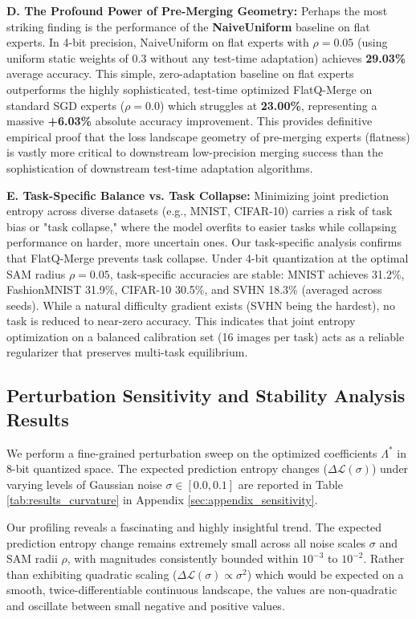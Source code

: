 \textbf{D. The Profound Power of Pre-Merging Geometry:}
Perhaps the most striking finding is the performance of the \textbf{NaiveUniform} baseline on flat experts. In 4-bit precision, NaiveUniform on flat experts with $\rho=0.05$ (using uniform static weights of 0.3 without any test-time adaptation) achieves \textbf{29.03\%} average accuracy. This simple, zero-adaptation baseline on flat experts outperforms the highly sophisticated, test-time optimized FlatQ-Merge on standard SGD experts ($\rho=0.0$) which struggles at \textbf{23.00\%}, representing a massive \textbf{+6.03\%} absolute accuracy improvement. This provides definitive empirical proof that the loss landscape geometry of pre-merging experts (flatness) is vastly more critical to downstream low-precision merging success than the sophistication of downstream test-time adaptation algorithms.

\textbf{E. Task-Specific Balance vs. Task Collapse:}
Minimizing joint prediction entropy across diverse datasets (e.g., MNIST, CIFAR-10) carries a risk of task bias or "task collapse," where the model overfits to easier tasks while collapsing performance on harder, more uncertain ones. Our task-specific analysis confirms that FlatQ-Merge prevents task collapse. Under 4-bit quantization at the optimal SAM radius $\rho=0.05$, task-specific accuracies are stable: MNIST achieves 31.2\%, FashionMNIST 31.9\%, CIFAR-10 30.5\%, and SVHN 18.3\% (averaged across seeds). While a natural difficulty gradient exists (SVHN being the hardest), no task is reduced to near-zero accuracy. This indicates that joint entropy optimization on a balanced calibration set (16 images per task) acts as a reliable regularizer that preserves multi-task equilibrium.

\subsection{Perturbation Sensitivity and Stability Analysis Results}

We perform a fine-grained perturbation sweep on the optimized coefficients $\Lambda^*$ in 8-bit quantized space. The expected prediction entropy changes ($\Delta \mathcal{L}(\sigma)$) under varying levels of Gaussian noise $\sigma \in [0.0, 0.1]$ are reported in Table \ref{tab:results_curvature} in Appendix \ref{sec:appendix_sensitivity}.

Our profiling reveals a fascinating and highly insightful trend. The expected prediction entropy change remains extremely small across all noise scales $\sigma$ and SAM radii $\rho$, with magnitudes consistently bounded within $10^{-3}$ to $10^{-2}$. Rather than exhibiting quadratic scaling ($\Delta \mathcal{L}(\sigma) \propto \sigma^2$) which would be expected on a smooth, twice-differentiable continuous landscape, the values are non-quadratic and oscillate between small negative and positive values.

